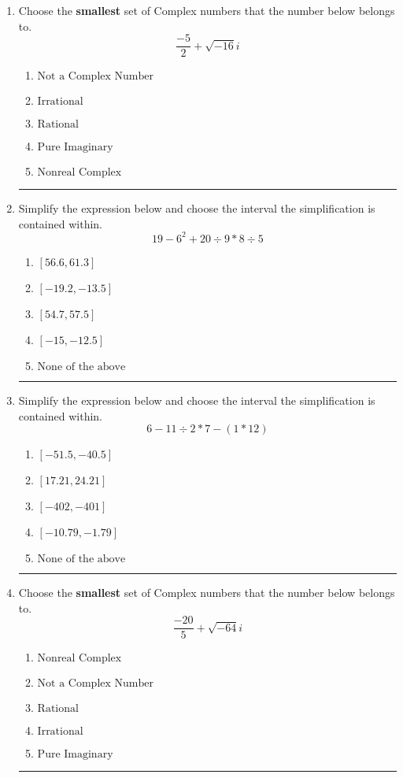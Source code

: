 \documentclass[14pt]{extbook}
\newcommand{\litem}[1]{\item#1\hspace*{-1cm}\rule{\textwidth}{0.4pt}}
\begin{document}
\begin{enumerate}
{\begin{enumerate}[label=\Alph*.]
\end{enumerate} }
\litem{
Choose the \textbf{smallest} set of Complex numbers that the number below belongs to.\[ \frac{-5}{2}+\sqrt{-16}i \]\begin{enumerate}[label=\Alph*.]
\item \( \text{Not a Complex Number} \)
\item \( \text{Irrational} \)
\item \( \text{Rational} \)
\item \( \text{Pure Imaginary} \)
\item \( \text{Nonreal Complex} \)

\end{enumerate} }
\litem{
Simplify the expression below and choose the interval the simplification is contained within.\[ 19 - 6^2 + 20 \div 9 * 8 \div 5 \]\begin{enumerate}[label=\Alph*.]
\item \( [56.6, 61.3] \)
\item \( [-19.2, -13.5] \)
\item \( [54.7, 57.5] \)
\item \( [-15, -12.5] \)
\item \( \text{None of the above} \)

\end{enumerate} }
\litem{
Simplify the expression below and choose the interval the simplification is contained within.\[ 6 - 11 \div 2 * 7 - (1 * 12) \]\begin{enumerate}[label=\Alph*.]
\item \( [-51.5, -40.5] \)
\item \( [17.21, 24.21] \)
\item \( [-402, -401] \)
\item \( [-10.79, -1.79] \)
\item \( \text{None of the above} \)

\end{enumerate} }
\litem{
Choose the \textbf{smallest} set of Complex numbers that the number below belongs to.\[ \frac{-20}{5}+\sqrt{-64}i \]\begin{enumerate}[label=\Alph*.]
\item \( \text{Nonreal Complex} \)
\item \( \text{Not a Complex Number} \)
\item \( \text{Rational} \)
\item \( \text{Irrational} \)
\item \( \text{Pure Imaginary} \)


\end{enumerate}}
\end{enumerate}
\end{document}
